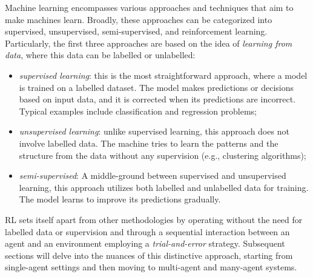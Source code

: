 Machine learning encompasses various approaches and techniques that aim to make machines learn. 
 Broadly, these approaches can be categorized into supervised, 
 unsupervised, semi-supervised, and reinforcement learning.
%
Particularly, the first three approaches are based on the idea of \emph{learning from data}, 
 where this data can be labelled or unlabelled:
\begin{itemize}
  \item \emph{supervised learning}: this is the most straightforward approach, where a model is trained on a labelled dataset. 
  The model makes predictions or decisions based on input data, 
  and it is corrected when its predictions are incorrect. 
  Typical examples include classification and regression problems;
  \item \emph{unsupervised learning}: unlike supervised learning, this approach does not involve labelled data. 
  The machine tries to learn the patterns and the structure from the data without any supervision (e.g., clustering algorithms);
  \item \emph{semi-supervised}: A middle-ground between supervised and unsupervised learning, this approach utilizes both labelled and unlabelled data for training. 
  The model learns to improve its predictions gradually.
\end{itemize}
\Ac{RL} sets itself apart from other methodologies 
 by operating without the need for labelled data or supervision and through a sequential interaction between an agent and an environment employing a \emph{trial-and-error} strategy. 
 Subsequent sections will delve into the nuances of this distinctive approach, 
 starting from single-agent settings and then moving to multi-agent and many-agent systems.
